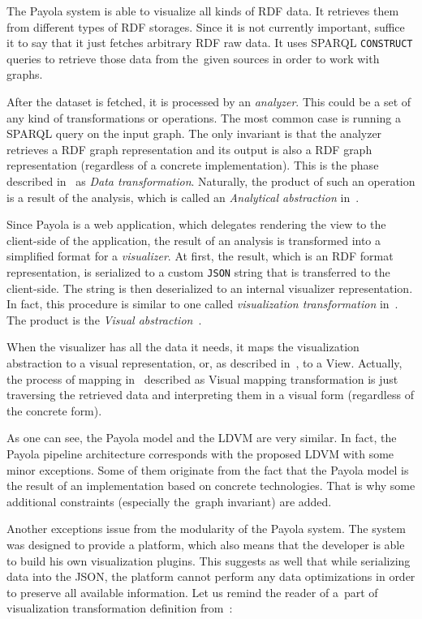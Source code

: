 The Payola system is able to visualize all kinds of RDF data. It retrieves them from different
types of RDF storages. Since it is not currently important, suffice it to say that it just fetches
arbitrary RDF raw data. It uses SPARQL \texttt{CONSTRUCT} queries to retrieve those data from
the~given sources in order to work with graphs.

After the dataset is fetched, it is processed by an \emph{analyzer}. This could be a set of any kind
of transformations or operations. The most common case is running a SPARQL query
on the input graph. The only invariant is that the analyzer retrieves a RDF graph
representation and its output is also a RDF graph representation (regardless of a concrete
implementation). This is the phase described in~\cite{ldvm} as \emph{Data transformation}.
Naturally, the product of such an operation is a result of the analysis, which is called an
\emph{Analytical abstraction} in~\cite{ldvm}.

Since Payola is a web application, which delegates rendering the view to the client-side
of the application, the result of an analysis is transformed into a simplified format for a \emph{visualizer}.
At first, the result, which is an RDF format representation, is serialized to a custom \texttt{JSON} string that is transferred to the client-side. The string is then deserialized to an internal visualizer
representation. In fact, this procedure is similar to one called \emph{visualization transformation}
in~\cite{ldvm}. The product is the \emph{Visual abstraction}~\cite{ldvm}.

When the visualizer has all the data it needs, it maps the visualization abstraction to a visual
representation, or, as described in~\cite{ldvm}, to a View. Actually, the process of mapping in~\cite{ldvm}
described as Visual mapping transformation is just traversing the retrieved data and interpreting
them in a visual form (regardless of the concrete form).

As one can see, the Payola model and the LDVM are very similar. In fact, the Payola pipeline
architecture corresponds with the proposed LDVM with some minor exceptions. Some of them originate from the fact that the Payola model is the result of an implementation
based on concrete technologies. That is why some additional constraints (especially
the~graph invariant) are added.

Another exceptions issue from the modularity of the Payola system. The system was designed
to provide a platform, which also means that the developer is able to build his own visualization 
plugins. This suggests as well that while serializing data into the JSON, the platform cannot perform
any data optimizations in order to preserve all available information. Let us remind the reader of
a~part of visualization transformation definition from~\cite{ldvm}:

